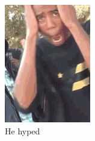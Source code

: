 \documentclass{report}
\begin{document}
\begin{figure}[h]
	\centering
    \includegraphics[width=\columnwidth]{danked.jpeg}
	\caption{He hyped}
\end{figure}
\end{document}
